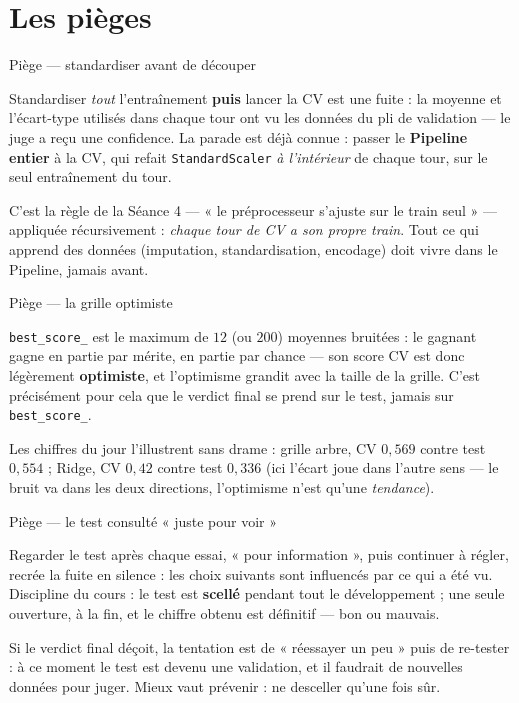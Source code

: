 \documentclass[aspectratio=169,11pt]{beamer}
\begin{document}
\section{Les pièges}

\begin{frame}{Piège — standardiser avant de découper}
\begin{ucadpiege}
{\small Standardiser \emph{tout} l'entraînement \textbf{puis} lancer la CV est une fuite : la moyenne et l'écart-type utilisés dans chaque tour ont vu les données du pli de validation — le juge a reçu une confidence. La parade est déjà connue : passer le \textbf{Pipeline entier} à la CV, qui refait \texttt{StandardScaler} \emph{à l'intérieur} de chaque tour, sur le seul entraînement du tour.}
\end{ucadpiege}
{\small C'est la règle de la Séance 4 — « le préprocesseur s'ajuste sur le train seul » — appliquée récursivement : \emph{chaque tour de CV a son propre train}. Tout ce qui apprend des données (imputation, standardisation, encodage) doit vivre dans le Pipeline, jamais avant.}
\end{frame}

\begin{frame}{Piège — la grille optimiste}
\begin{ucadpiege}
{\small \texttt{best\_score\_} est le maximum de $12$ (ou $200$) moyennes bruitées : le gagnant gagne en partie par mérite, en partie par chance — son score CV est donc légèrement \textbf{optimiste}, et l'optimisme grandit avec la taille de la grille. C'est précisément pour cela que le verdict final se prend sur le test, jamais sur \texttt{best\_score\_}.}
\end{ucadpiege}
{\small Les chiffres du jour l'illustrent sans drame : grille arbre, CV $0{,}569$ contre test $0{,}554$ ; Ridge, CV $0{,}42$ contre test $0{,}336$ (ici l'écart joue dans l'autre sens — le bruit va dans les deux directions, l'optimisme n'est qu'une \emph{tendance}).}
\end{frame}

\begin{frame}{Piège — le test consulté « juste pour voir »}
\begin{ucadpiege}
{\small Regarder le test après chaque essai, « pour information », puis continuer à régler, recrée la fuite en silence : les choix suivants sont influencés par ce qui a été vu. Discipline du cours : le test est \textbf{scellé} pendant tout le développement ; une seule ouverture, à la fin, et le chiffre obtenu est définitif — bon ou mauvais.}
\end{ucadpiege}
{\small Si le verdict final déçoit, la tentation est de « réessayer un peu » puis de re-tester : à ce moment le test est devenu une validation, et il faudrait de nouvelles données pour juger. Mieux vaut prévenir : ne desceller qu'une fois sûr.}
\end{frame}
\end{document}
